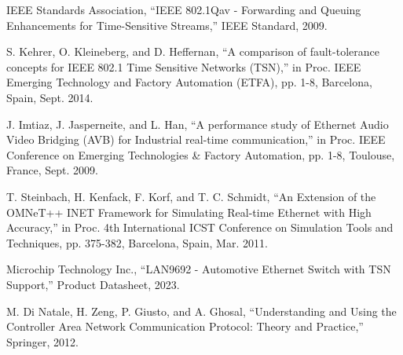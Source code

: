 \documentclass[10pt,twocolumn]{article}
\begin{document}
\begin{thebibliography}{99}
IEEE Standards Association, ``IEEE 802.1Qav - Forwarding and Queuing Enhancements for Time-Sensitive Streams,'' IEEE Standard, 2009.

S. Kehrer, O. Kleineberg, and D. Heffernan, ``A comparison of fault-tolerance concepts for IEEE 802.1 Time Sensitive Networks (TSN),'' in Proc. IEEE Emerging Technology and Factory Automation (ETFA), pp. 1-8, Barcelona, Spain, Sept. 2014.

J. Imtiaz, J. Jasperneite, and L. Han, ``A performance study of Ethernet Audio Video Bridging (AVB) for Industrial real-time communication,'' in Proc. IEEE Conference on Emerging Technologies \& Factory Automation, pp. 1-8, Toulouse, France, Sept. 2009.

T. Steinbach, H. Kenfack, F. Korf, and T. C. Schmidt, ``An Extension of the OMNeT++ INET Framework for Simulating Real-time Ethernet with High Accuracy,'' in Proc. 4th International ICST Conference on Simulation Tools and Techniques, pp. 375-382, Barcelona, Spain, Mar. 2011.

Microchip Technology Inc., ``LAN9692 - Automotive Ethernet Switch with TSN Support,'' Product Datasheet, 2023.

M. Di Natale, H. Zeng, P. Giusto, and A. Ghosal, ``Understanding and Using the Controller Area Network Communication Protocol: Theory and Practice,'' Springer, 2012.
\end{thebibliography}
\end{document}
